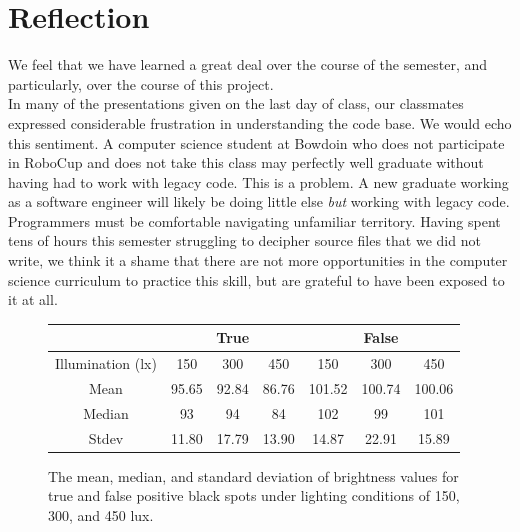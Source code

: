 \documentclass[11pt, twocolumn]{article}
\begin{document}
\section{Reflection}
We feel that we have learned a great deal over the course of the semester, and particularly, over the course of this project. \\
\indent In many of the presentations given on the last day of class, our classmates expressed considerable frustration in understanding the code base. We would echo this sentiment. A computer science student at Bowdoin who does not participate in RoboCup and does not take this class  may perfectly well graduate without having had to work with legacy code. This is a problem. A new graduate working as a software engineer will likely be doing little else \emph{but} working with legacy code. Programmers must be comfortable navigating unfamiliar territory. Having spent tens of hours this semester struggling to decipher source files that we did not write, we think it a shame that there are not more opportunities in the computer science curriculum to practice this skill, but are grateful to have been exposed to it at all.
\onecolumn
\begin{figure}[h]
\label{fig:table}
\centering
\begin{tabular}{ccccccc}
\toprule
 & \multicolumn{3}{c}{True} & \multicolumn{3}{c}{False} \\
\midrule
Illumination (lx) & 150 & 300 & 450 & 150 & 300 & 450 \\
\midrule
Mean & 95.65 & 92.84 & 86.76 & 101.52 & 100.74 & 100.06 \\
Median & 93 & 94 & 84 & 102 & 99 & 101 \\
Stdev & 11.80 & 17.79 & 13.90 & 14.87 & 22.91 & 15.89 \\
\bottomrule
\end{tabular}
\caption{The mean, median, and standard deviation of brightness values for true and false positive black spots under lighting conditions of 150, 300, and 450 lux.}
\end{figure}
\end{document}
